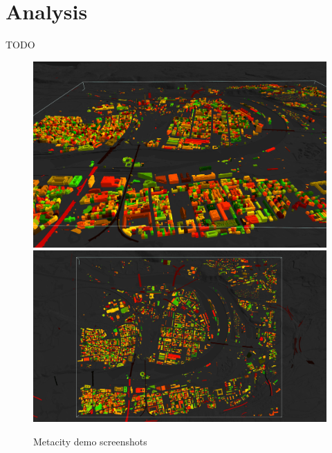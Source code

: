 \section{Analysis}
TODO

\begin{figure}[t]
    \centering
    \includegraphics[width=\linewidth]{img/metacity0.png}
    \includegraphics[width=\linewidth]{img/metacity1.png}
    \caption{Metacity demo screenshots}
\end{figure}


